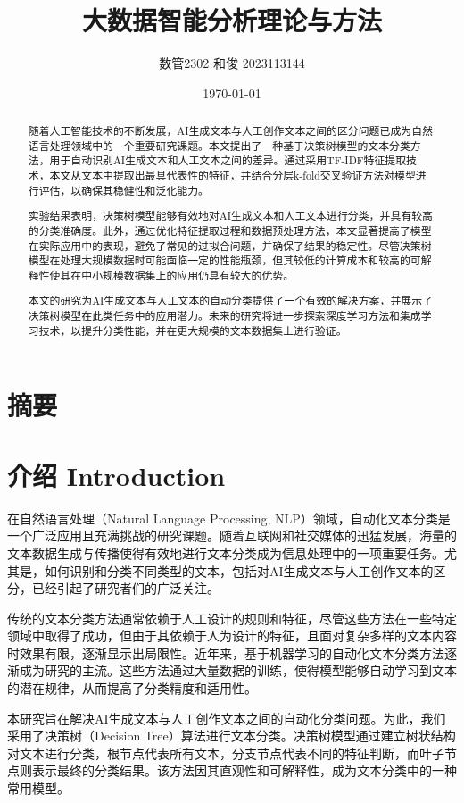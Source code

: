 \documentclass[UTF8]{ctexart}
\title{大数据智能分析理论与方法}
\author{数管2302 和俊 2023113144}
\date{\today}
\begin{document}
\fancyfoot[C]{\thepage}

\maketitle
\tableofcontents
\newpage

\section{摘要}
\begin{abstract}
随着人工智能技术的不断发展，AI生成文本与人工创作文本之间的区分问题已成为自然语言处理领域中的一个重要研究课题。本文提出了一种基于决策树模型的文本分类方法，用于自动识别AI生成文本和人工文本之间的差异。通过采用TF-IDF特征提取技术，本文从文本中提取出最具代表性的特征，并结合分层k-fold交叉验证方法对模型进行评估，以确保其稳健性和泛化能力。

实验结果表明，决策树模型能够有效地对AI生成文本和人工文本进行分类，并具有较高的分类准确度。此外，通过优化特征提取过程和数据预处理方法，本文显著提高了模型在实际应用中的表现，避免了常见的过拟合问题，并确保了结果的稳定性。尽管决策树模型在处理大规模数据时可能面临一定的性能瓶颈，但其较低的计算成本和较高的可解释性使其在中小规模数据集上的应用仍具有较大的优势。

本文的研究为AI生成文本与人工文本的自动分类提供了一个有效的解决方案，并展示了决策树模型在此类任务中的应用潜力。未来的研究将进一步探索深度学习方法和集成学习技术，以提升分类性能，并在更大规模的文本数据集上进行验证。
\end{abstract}


\section{介绍 Introduction}
在自然语言处理（Natural Language Processing, NLP）领域，自动化文本分类是一个广泛应用且充满挑战的研究课题。随着互联网和社交媒体的迅猛发展，海量的文本数据生成与传播使得有效地进行文本分类成为信息处理中的一项重要任务。尤其是，如何识别和分类不同类型的文本，包括对AI生成文本与人工创作文本的区分，已经引起了研究者们的广泛关注。

传统的文本分类方法通常依赖于人工设计的规则和特征，尽管这些方法在一些特定领域中取得了成功，但由于其依赖于人为设计的特征，且面对复杂多样的文本内容时效果有限，逐渐显示出局限性。近年来，基于机器学习的自动化文本分类方法逐渐成为研究的主流。这些方法通过大量数据的训练，使得模型能够自动学习到文本的潜在规律，从而提高了分类精度和适用性。

本研究旨在解决AI生成文本与人工创作文本之间的自动化分类问题。为此，我们采用了决策树（Decision Tree）算法进行文本分类。决策树模型通过建立树状结构对文本进行分类，根节点代表所有文本，分支节点代表不同的特征判断，而叶子节点则表示最终的分类结果。该方法因其直观性和可解释性，成为文本分类中的一种常用模型。
\end{document}
